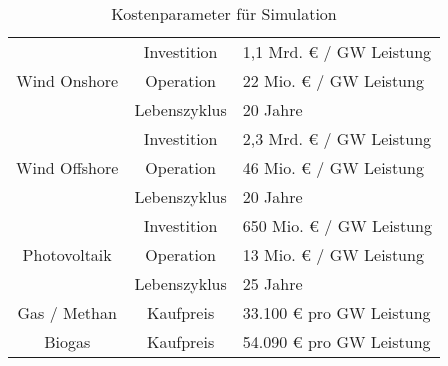 \begin{table}[h!]
    \centering
    \begin{tabular}{|ccl|}
    \hline
    \multicolumn{1}{|c|}{\multirow{3}{*}{Wind Onshore}} & \multicolumn{1}{c|}{Investition}   & 1,1 Mrd. € / GW Leistung \\ \cline{2-3} 
    \multicolumn{1}{|c|}{}                              & \multicolumn{1}{c|}{Operation}     & 22 Mio. € / GW Leistung  \\ \cline{2-3} 
    \multicolumn{1}{|c|}{}                              & \multicolumn{1}{c|}{Lebenszyklus}  & 20 Jahre                 \\ \hline
    \multicolumn{1}{|c|}{\multirow{3}{*}{Wind Offshore}} & \multicolumn{1}{c|}{Investition}  & 2,3 Mrd. € / GW Leistung \\ \cline{2-3} 
    \multicolumn{1}{|c|}{}                              & \multicolumn{1}{c|}{Operation}     & 46 Mio. € / GW Leistung  \\ \cline{2-3} 
    \multicolumn{1}{|c|}{}                              & \multicolumn{1}{c|}{Lebenszyklus}  & 20 Jahre                 \\ \hline
    \multicolumn{1}{|c|}{\multirow{3}{*}{Photovoltaik}} & \multicolumn{1}{c|}{Investition}   & 650 Mio. € / GW Leistung \\ \cline{2-3} 
    \multicolumn{1}{|c|}{}                              & \multicolumn{1}{c|}{Operation}     & 13 Mio. € / GW Leistung  \\ \cline{2-3} 
    \multicolumn{1}{|c|}{}                              & \multicolumn{1}{c|}{Lebenszyklus}  & 25 Jahre                 \\ \hline
    \multicolumn{1}{|c|}{Gas / Methan}                  & \multicolumn{1}{c|}{Kaufpreis}     & 33.100 € pro GW Leistung \\ \hline
    \multicolumn{1}{|c|}{Biogas}                        & \multicolumn{1}{c|}{Kaufpreis}     & 54.090 € pro GW Leistung \\ \hline
    \end{tabular}
    \caption{Kostenparameter für Simulation}
    \label{tab:my-table}
\end{table}

